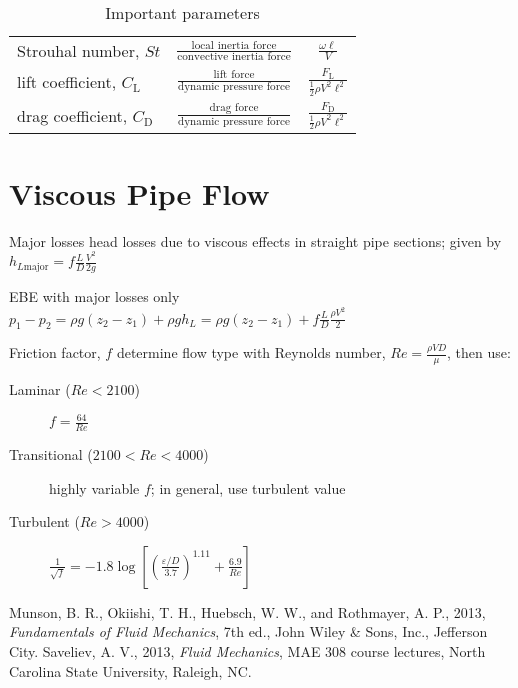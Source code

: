 \documentclass{article}
\begin{document}
\begin{table}
{\begin{tabu}{lcc}
  Strouhal number, \(\mathit{St}\)
  & \(\frac{\textrm{local inertia force}}{\textrm{convective inertia force}}\)
  & \(\frac{\omega\ell}{V}\) \\
  lift coefficient, \(C_\mathrm{L}\) & \(\frac{\textrm{lift force}}{\textrm{dynamic pressure force}}\)
  & \(\frac{F_\mathrm{L}}{\frac12\rho{}V^2\ell^2}\) \\
  drag coefficient, \(C_\mathrm{D}\) & \(\frac{\textrm{drag force}}{\textrm{dynamic pressure force}}\)
  & \(\frac{F_\mathrm{D}}{\frac12\rho{}V^2\ell^2}\) \\
  \bottomrule
  \end{tabu}}
  \caption{Important parameters}\label{tab:params}
\end{table}

\section{Viscous Pipe Flow}

\begin{description*}
\item[Major losses] head losses due to viscous effects in straight pipe sections; given by
  \(h_{L\mathrm{major}} = f\frac{L}{D}\frac{V^2}{2g}\)
\item[EBE with major losses only]
  \(p_1-p_2 = \rho{}g(z_2-z_1)+\rho{}gh_L = \rho{}g(z_2-z_1) + f\frac{L}{D}\frac{\rho{}V^2}{2}\)
\item[Friction factor, $f$] determine flow type with Reynolds number,
  \(\mathit{Re} = \frac{\rho{}VD}{\mu}\), then use:
  \begin{description}
  \item[Laminar (\(\mathit{Re}<2100\))]
    \(f = \frac{64}{\mathit{Re}}\)
  \item[Transitional (\(2100<\mathit{Re}<4000\))]
    highly variable $f$; in general, use turbulent value
  \item[Turbulent (\(\mathit{Re}>4000\))]
    \(\frac{1}{\sqrt{f}}
    = -1.8\log\left[\left(\frac{\varepsilon/D}{3.7}\right)^{1.11}
      + \frac{6.9}{\mathit{Re}}\right]\)
  \end{description}
\end{description*}

\begin{thebibliography}{99}
 Munson, B. R., Okiishi, T. H., Huebsch, W. W., and Rothmayer, A. P., 2013,
  \emph{Fundamentals of Fluid Mechanics}, 7th ed., John Wiley \& Sons, Inc., Jefferson City.
 Saveliev, A. V., 2013, \emph{Fluid Mechanics}, MAE 308 course lectures, North
  Carolina State University, Raleigh, NC.
\end{thebibliography}
\end{document}
